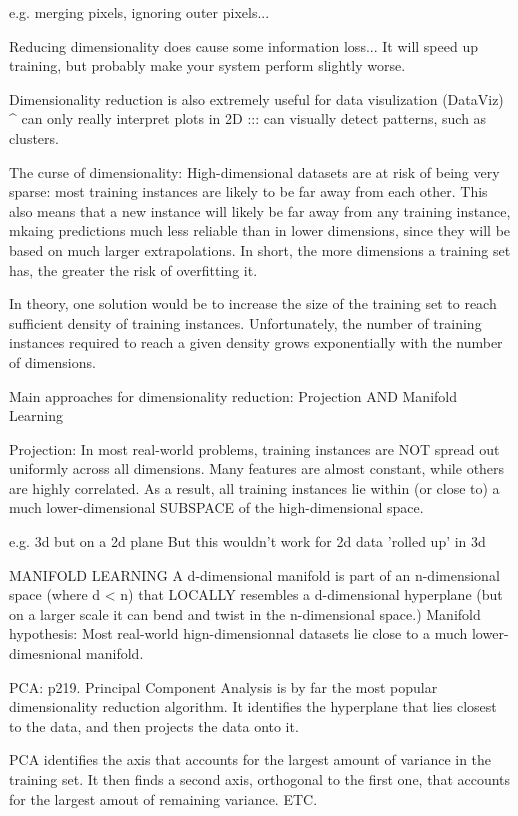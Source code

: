 e.g. merging pixels, ignoring outer pixels...

Reducing dimensionality does cause some information loss...
It will speed up training, but probably make your system perform slightly worse.

Dimensionality reduction is also extremely useful for data visulization (DataViz)
^ can only really interpret plots in 2D ::: can visually detect patterns, such as clusters.


The curse of dimensionality:
High-dimensional datasets are at risk of being very sparse:
most training instances are likely to be far away from each other.
This also means that a new instance will likely be far away from any training instance,
mkaing predictions much less reliable than in lower dimensions,
since they will be based on much larger extrapolations.
In short, the more dimensions a training set has,
the greater the risk of overfitting it.

In theory,
one solution would be to increase the size of the training set to reach sufficient density of training instances.
Unfortunately,
the number of training instances required to reach a given density grows exponentially with the number of dimensions.

Main approaches for dimensionality reduction:
Projection AND Manifold Learning

Projection:
In most real-world problems,
training instances are NOT spread out uniformly across all dimensions.
Many features are almost constant,
while others are highly correlated.
As a result, all training instances lie within (or close to)
a much lower-dimensional SUBSPACE of the high-dimensional space.

e.g. 3d but on a 2d plane
But this wouldn't work for 2d data 'rolled up' in 3d

MANIFOLD LEARNING
A d-dimensional manifold is part of an n-dimensional space (where d < n)
that LOCALLY resembles a d-dimensional hyperplane
(but on a larger scale it can bend and twist in the n-dimensional space.)
Manifold hypothesis:
Most real-world hign-dimensionnal datasets lie close to a much lower-dimesnional manifold.

PCA: p219.
Principal Component Analysis is by far the most popular dimensionality reduction algorithm.
It identifies the hyperplane that lies closest to the data,
and then projects the data onto it.

PCA identifies the axis that accounts for the largest amount of variance in the training set.
It then finds a second axis, orthogonal to the first one,
that accounts for the largest amout of remaining variance. ETC.


